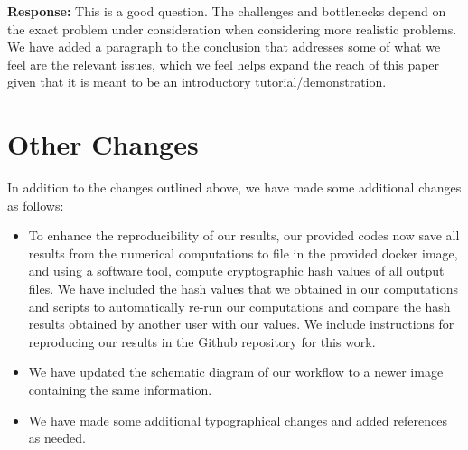\documentclass{article}
\begin{document}
\begin{enumerate}
  \textbf{Response:} This is a good question. The challenges and
  bottlenecks depend on the exact problem under consideration when considering
  more realistic problems. We have added a paragraph to the conclusion
  that addresses some of what we feel are the relevant issues, which
  we feel helps expand the reach of this paper given that it is meant
  to be an introductory tutorial/demonstration.
  
\end{enumerate}

\section{Other Changes}

In addition to the changes outlined above, we have made some additional
changes as follows:

\begin{itemize}

  \item To enhance the reproducibility of our results,
    our provided codes now save all results from the numerical computations
    to file in the provided docker image, and using a software tool,
    compute cryptographic hash values of all output files. We have included
    the hash values that we obtained in our computations and scripts to
    automatically re-run our computations and compare the hash results
    obtained by another user with our values. We include instructions
    for reproducing our results in the Github repository for this work.

  \item We have updated the schematic diagram of our workflow to a newer
    image containing the same information.

  \item We have made some additional typographical changes and added
    references as needed.

\end{itemize}
\end{document}
